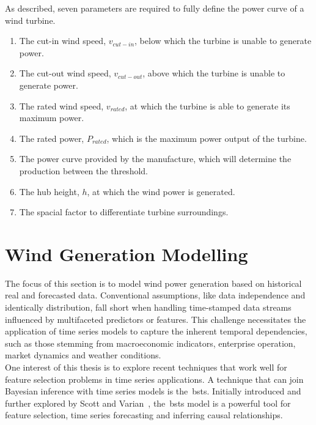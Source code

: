     As described, seven parameters are required to fully define the power curve of a wind turbine.

    \begin{enumerate}
        \item The cut-in wind speed, $v_{cut-in}$, below which the turbine is unable to generate power.
        \item The cut-out wind speed, $v_{cut-out}$, above which the turbine is unable to generate power.
        \item The rated wind speed, $v_{rated}$, at which the turbine is able to generate its maximum power.
        \item The rated power, $P_{rated}$, which is the maximum power output of the turbine.
        \item The power curve provided by the manufacture, which will determine the production between the threshold.
        \item The hub height, $h$, at which the wind power is generated.
        \item The spacial factor to differentiate turbine surroundings.
    \end{enumerate}

\section{Wind Generation Modelling}
    \label{sec:wind_generation_modelling}

    The focus of this section is to model wind power generation based on historical real and forecasted data.
    Conventional assumptions, like data independence and identically distribution, fall short when handling time-stamped
    data streams influenced by multifaceted predictors or features.
    This challenge necessitates the application of time series models to capture the inherent temporal dependencies,
    such as those stemming from macroeconomic indicators, enterprise operation, market dynamics and weather conditions.\\

    One interest of this thesis is to explore recent techniques that work well for feature selection problems in
    time series applications.
    A technique that can join Bayesian inference with time series models is the~\gls{bsts}.
    Initially introduced and further explored by Scott and Varian~\cite{scott_predicting_2013, scott_bayesian_2013},
    the~\gls{bsts} model is a powerful tool for feature selection, time series forecasting and inferring causal relationships. \\

